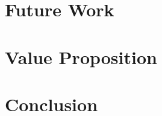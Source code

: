 \documentclass[12pt]{article}
\renewcommand{\_}{\kern-1.5pt\textunderscore\kern-1.5pt}
\begin{document}
\section{Future Work}


\section{Value Proposition}


\section{Conclusion}

\newpage


\begingroup
\raggedright

{}

\nocite{*}

\endgroup

\newpage
\end{document}
